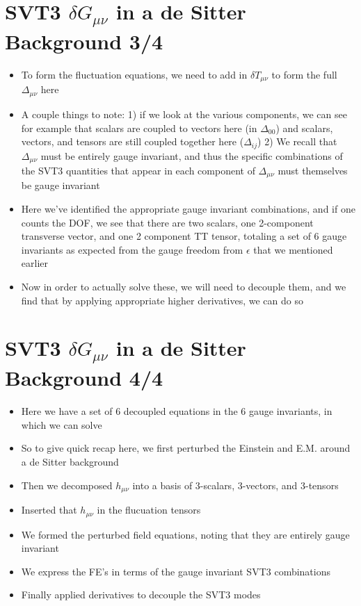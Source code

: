 \documentclass[10pt,letterpaper]{article}
\numberwithin{equation}{section}
\begin{document}

\section{SVT3 $\delta G_{\mu\nu}$ in a de Sitter Background 3/4}
\begin{itemize}
	\item To form the fluctuation equations, we need to add in $\delta T_{\mu\nu}$ to form the full $\Delta_{\mu\nu}$ here
	\item A couple things to note: 
	1) if we look at the various components, we can see for example that scalars are coupled to vectors here (in $\Delta_{00}$) and scalars, vectors, and tensors are still coupled together here ($\Delta_{ij}$)
	2) We recall that $\Delta_{\mu\nu}$ must be entirely gauge invariant, and thus the specific combinations of the SVT3 quantities that appear in each component of $\Delta_{\mu\nu}$ must themselves be gauge invariant
	\item Here we've identified the appropriate gauge invariant combinations, and if one counts the DOF, we see that there are two scalars, one 2-component transverse vector, and one 2 component TT tensor, totaling a set of 6 gauge invariants as expected from the gauge freedom from $\epsilon$ that we mentioned earlier
	\item Now in order to actually solve these, we will need to decouple them, and we find that by applying appropriate higher derivatives, we can do so
\end{itemize}


\section{SVT3 $\delta G_{\mu\nu}$ in a de Sitter Background 4/4}
\begin{itemize}
	\item Here we have a set of 6 decoupled equations in the 6 gauge invariants, in which we can solve 
	\item So to give quick recap here, we first perturbed the Einstein and E.M. around a de Sitter background
	\item Then we decomposed $h_{\mu\nu}$ into a basis of 3-scalars, 3-vectors, and 3-tensors
	\item Inserted that $h_{\mu\nu}$ in the flucuation tensors
	\item We formed the perturbed field equations, noting that they are entirely gauge invariant
	\item We express the FE's in terms of the gauge invariant SVT3 combinations
	\item Finally applied derivatives to decouple the SVT3 modes
\end{itemize}
  
\end{document}
